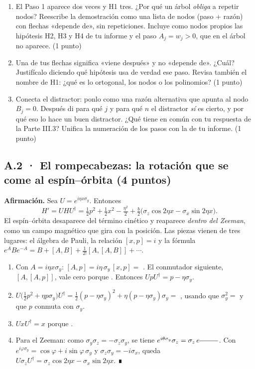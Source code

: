 \begin{enumerate}
\def\labelenumi{(\alph{enumi})}
\item El Paso 1 aparece dos veces y H1 tres. ¿Por qué un árbol \emph{obliga} a repetir nodos? Reescribe la demostración como una lista de nodos (paso + razón) con flechas «depende de», sin repeticiones. Incluye como nodos propios las hipótesis H2, H3 y H4 de tu informe y el paso $A_j = w_j > 0$, que en el árbol no aparece. (1 punto)
\item Una de tus flechas significa «viene después» y no «depende de». ¿Cuál? Justifícalo diciendo qué hipótesis usa de verdad ese paso. Revisa también el nombre de H1: ¿qué es lo ortogonal, los nodos o los polinomios? (1 punto)
\item Conecta el distractor: ponlo como una razón alternativa que apunta al nodo $B_j = 0$. Después di para qué $j$ y para qué $n$ el distractor \emph{sí} es cierto, y por qué eso lo hace un buen distractor. ¿Qué tiene en común con tu respuesta de la Parte III.3? Unifica la numeración de los pasos con la de tu informe. (1 punto)
\end{enumerate}


\subsection{A.2 · El rompecabezas: la rotación que se come al espín--órbita (4 puntos)}

\textbf{Afirmación.} Sea $U = e^{i\eta x\sigma_y}$. Entonces
\[ H' = U H U^\dagger = \tfrac12 p^2 + \tfrac12 x^2 - \tfrac{\eta^2}{2} + \tfrac{b}{2}\bigl(\sigma_z\cos 2\eta x - \sigma_x\sin 2\eta x\bigr). \]
El espín--órbita desaparece del término cinético y reaparece \emph{dentro del Zeeman}, como un campo magnético que gira con la posición. Las piezas vienen de tres lugares: el álgebra de Pauli, la relación $[x,p] = i$ y la fórmula $e^{A}Be^{-A} = B + [A,B] + \tfrac{1}{2!}[A,[A,B]] + \cdots$.

\begin{enumerate}
\def\labelenumi{\arabic{enumi}.}
\item Con $A = i\eta x\sigma_y$: $[A, p] = i\eta\,\sigma_y\,[x,p] = $ . El conmutador siguiente, $[A,[A,p]]$, vale cero porque . Entonces $UpU^\dagger = p - \eta\sigma_y$.
\item $U\bigl(\tfrac12 p^2 + \eta p\sigma_y\bigr)U^\dagger = \tfrac12(p - \eta\sigma_y)^2 + \eta(p-\eta\sigma_y)\sigma_y = $ , usando que $\sigma_y^2 = $  y que $p$ conmuta con $\sigma_y$.
\item $UxU^\dagger = x$ porque .
\item Para el Zeeman: como $\sigma_y\sigma_z = -\sigma_z\sigma_y$, se tiene $e^{i\theta\sigma_y}\sigma_z = \sigma_z\, e^{\hueco{8}}$. Con $e^{i\varphi\sigma_y} = \cos\varphi + i\sin\varphi\,\sigma_y$ y $\sigma_z\sigma_y = -i\sigma_x$, queda $U\sigma_zU^\dagger = \sigma_z\cos 2\eta x - \sigma_x\sin 2\eta x$. ∎
\end{enumerate}

